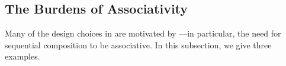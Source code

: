 


\subsection{The Burdens of Associativity}
\label{sec:ex:assoc}

Many of the design choices in \PwT{} are motivated by
---in particular, the need for sequential composition to
be associative.  In this subsection, we give three examples.

